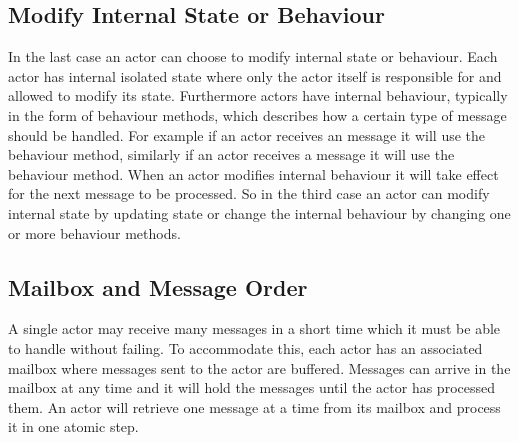 \subsection{Modify Internal State or Behaviour}
In the last case an actor can choose to modify internal state or behaviour. Each actor has internal isolated state where only the actor itself is responsible for and allowed to modify its state. Furthermore actors have internal behaviour, typically in the form of behaviour methods, which describes how a certain type of message should be handled. For example if an actor receives an  message it will use the  behaviour method, similarly  if an actor receives a  message it will use the  behaviour method. When an actor modifies internal behaviour it will take effect for the next message to be processed. So in the third case an actor can modify internal state by updating state or change the internal behaviour by changing one or more behaviour methods. 

\subsection{Mailbox and Message Order}\label{ssec:mailbox_and_message_order}
A single actor may receive many messages in a short time which it must be able to handle without failing. To accommodate this, each actor has an associated mailbox where messages sent to the actor are buffered\cite[Chap. 2.6]{haller2012actors}. Messages can arrive in the mailbox at any time and it will hold the messages until the actor has processed them. An actor will retrieve one message at a time from its mailbox and process it in one atomic step\cite[p. 2]{karmani2009actor}.

